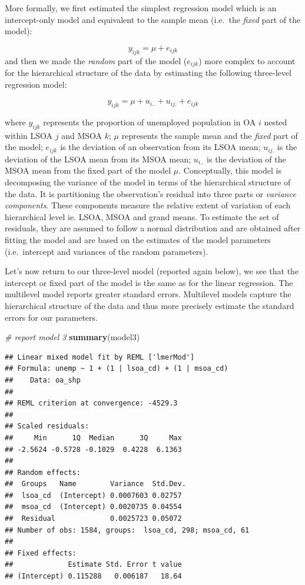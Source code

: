 \documentclass[
]{book}
\newenvironment{Shaded}{\begin{snugshade}}{\end{snugshade}}
\newcommand{\CommentTok}[1]{\textcolor[rgb]{0.56,0.35,0.01}{\textit{#1}}}
\newcommand{\KeywordTok}[1]{\textcolor[rgb]{0.13,0.29,0.53}{\textbf{#1}}}
\newcommand{\NormalTok}[1]{#1}
\begin{document}
More formally, we first estimated the simplest regression model which is an intercept-only model and equivalent to the sample mean (i.e.~the \emph{fixed} part of the model):

\[y_{ijk} = \mu + e_{ijk}\]
and then we made the \emph{random} part of the model (\(e_{ijk}\)) more complex to account for the hierarchical structure of the data by estimating the following three-level regression model:

\[y_{ijk} = \mu + u_{i..} + u_{ij.} + e_{ijk}\]

where \(y_{ijk}\) represents the proportion of unemployed population in OA \(i\) nested within LSOA \(j\) and MSOA \(k\); \(\mu\) represents the sample mean and the \emph{fixed} part of the model; \(e_{ijk}\) is the deviation of an observation from its LSOA mean; \(u_{ij.}\) is the deviation of the LSOA mean from its MSOA mean; \(u_{i..}\) is the deviation of the MSOA mean from the fixed part of the model \(\mu\). Conceptually, this model is decomposing the variance of the model in terms of the hierarchical structure of the data. It is partitioning the observation's residual into three parts or \emph{variance components}. These components measure the relative extent of variation of each hierarchical level ie. LSOA, MSOA and grand means. To estimate the set of residuals, they are assumed to follow a normal distribution and are obtained after fitting the model and are based on the estimates of the model parameters (i.e.~intercept and variances of the random parameters).

Let's now return to our three-level model (reported again below), we see that the intercept or fixed part of the model is the same as for the linear regression. The multilevel model reports greater standard errors. Multilevel models capture the hierarchical structure of the data and thus more precisely estimate the standard errors for our parameters.

\begin{Shaded}
\begin{Highlighting}[]
\CommentTok{# report model 3}
\KeywordTok{summary}\NormalTok{(model3)}
\end{Highlighting}
\end{Shaded}

\begin{verbatim}
## Linear mixed model fit by REML ['lmerMod']
## Formula: unemp ~ 1 + (1 | lsoa_cd) + (1 | msoa_cd)
##    Data: oa_shp
## 
## REML criterion at convergence: -4529.3
## 
## Scaled residuals: 
##     Min      1Q  Median      3Q     Max 
## -2.5624 -0.5728 -0.1029  0.4228  6.1363 
## 
## Random effects:
##  Groups   Name        Variance  Std.Dev.
##  lsoa_cd  (Intercept) 0.0007603 0.02757 
##  msoa_cd  (Intercept) 0.0020735 0.04554 
##  Residual             0.0025723 0.05072 
## Number of obs: 1584, groups:  lsoa_cd, 298; msoa_cd, 61
## 
## Fixed effects:
##             Estimate Std. Error t value
## (Intercept) 0.115288   0.006187   18.64
\end{verbatim}
\end{document}
